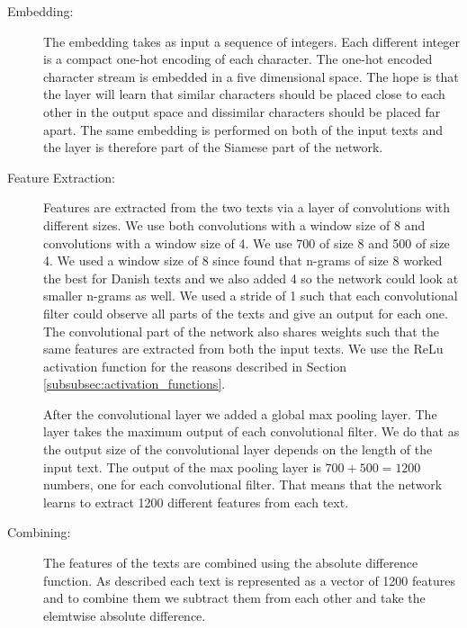 \begin{description}

    \item[Embedding:]

        The embedding takes as input a sequence of integers. Each different
        integer is a compact one-hot encoding of each character. The one-hot
        encoded character stream is embedded in a five dimensional space. The
        hope is that the layer will learn that similar characters should be
        placed close to each other in the output space and dissimilar characters
        should be placed far apart. The same embedding is performed on both of
        the input texts and the layer is therefore part of the Siamese part of
        the network.

    \item[Feature Extraction:]

        Features are extracted from the two texts via a layer of convolutions
        with different sizes. We use both convolutions with a window size of
        8 and convolutions with a window size of 4. We use 700 of size 8 and
        500 of size 4. We used a window size of 8 since \citet{aalykke2016}
        found that n-grams of size 8 worked the best for Danish texts and we
        also added 4 so the network could look at smaller n-grams as well.
        We used a stride of 1 such that each convolutional filter could
        observe all parts of the texts and give an output for each one. The
        convolutional part of the network also shares weights such that the
        same features are extracted from both the input texts. We use the
        \gls{ReLu} activation function for the reasons described in Section
        \ref{subsubsec:activation_functions}.

        After the convolutional layer we added a global max pooling layer. The
        layer takes the maximum output of each convolutional filter. We do that
        as the output size of the convolutional layer depends on the length of
        the input text. The output of the max pooling layer is $700 + 500 =
        1200$ numbers, one for each convolutional filter. That means that the
        network learns to extract 1200 different features from each text.

    \item[Combining:]

        The features of the texts are combined using the absolute difference
        function. As described each text is represented as a vector of 1200
        features and to combine them we subtract them from each other and take
        the elemtwise absolute difference.


\end{description}

